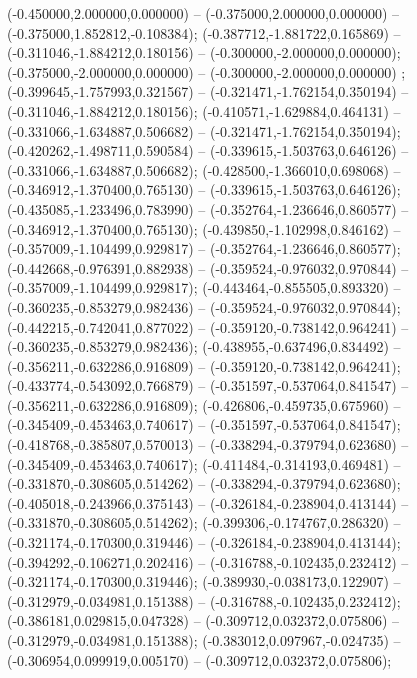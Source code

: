  (-0.450000,2.000000,0.000000) -- (-0.375000,2.000000,0.000000) -- (-0.375000,1.852812,-0.108384);
 (-0.387712,-1.881722,0.165869) -- (-0.311046,-1.884212,0.180156) -- (-0.300000,-2.000000,0.000000);
 (-0.375000,-2.000000,0.000000) -- (-0.300000,-2.000000,0.000000) ;
 (-0.399645,-1.757993,0.321567) -- (-0.321471,-1.762154,0.350194) -- (-0.311046,-1.884212,0.180156);
 (-0.410571,-1.629884,0.464131) -- (-0.331066,-1.634887,0.506682) -- (-0.321471,-1.762154,0.350194);
 (-0.420262,-1.498711,0.590584) -- (-0.339615,-1.503763,0.646126) -- (-0.331066,-1.634887,0.506682);
 (-0.428500,-1.366010,0.698068) -- (-0.346912,-1.370400,0.765130) -- (-0.339615,-1.503763,0.646126);
 (-0.435085,-1.233496,0.783990) -- (-0.352764,-1.236646,0.860577) -- (-0.346912,-1.370400,0.765130);
 (-0.439850,-1.102998,0.846162) -- (-0.357009,-1.104499,0.929817) -- (-0.352764,-1.236646,0.860577);
 (-0.442668,-0.976391,0.882938) -- (-0.359524,-0.976032,0.970844) -- (-0.357009,-1.104499,0.929817);
 (-0.443464,-0.855505,0.893320) -- (-0.360235,-0.853279,0.982436) -- (-0.359524,-0.976032,0.970844);
 (-0.442215,-0.742041,0.877022) -- (-0.359120,-0.738142,0.964241) -- (-0.360235,-0.853279,0.982436);
 (-0.438955,-0.637496,0.834492) -- (-0.356211,-0.632286,0.916809) -- (-0.359120,-0.738142,0.964241);
 (-0.433774,-0.543092,0.766879) -- (-0.351597,-0.537064,0.841547) -- (-0.356211,-0.632286,0.916809);
 (-0.426806,-0.459735,0.675960) -- (-0.345409,-0.453463,0.740617) -- (-0.351597,-0.537064,0.841547);
 (-0.418768,-0.385807,0.570013) -- (-0.338294,-0.379794,0.623680) -- (-0.345409,-0.453463,0.740617);
 (-0.411484,-0.314193,0.469481) -- (-0.331870,-0.308605,0.514262) -- (-0.338294,-0.379794,0.623680);
 (-0.405018,-0.243966,0.375143) -- (-0.326184,-0.238904,0.413144) -- (-0.331870,-0.308605,0.514262);
 (-0.399306,-0.174767,0.286320) -- (-0.321174,-0.170300,0.319446) -- (-0.326184,-0.238904,0.413144);
 (-0.394292,-0.106271,0.202416) -- (-0.316788,-0.102435,0.232412) -- (-0.321174,-0.170300,0.319446);
 (-0.389930,-0.038173,0.122907) -- (-0.312979,-0.034981,0.151388) -- (-0.316788,-0.102435,0.232412);
 (-0.386181,0.029815,0.047328) -- (-0.309712,0.032372,0.075806) -- (-0.312979,-0.034981,0.151388);
 (-0.383012,0.097967,-0.024735) -- (-0.306954,0.099919,0.005170) -- (-0.309712,0.032372,0.075806);
